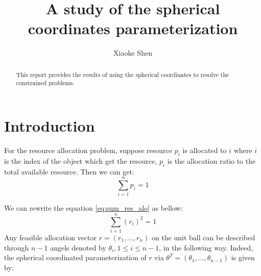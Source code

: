 \documentclass[a4paper,12pt]{article}
\title {A study of the spherical coordinates parameterization}
\author{Xiaoke Shen}
\affil{the Graduate Center, the City University of New York}
\date{}
\begin{document}
\maketitle

\begin{abstract}
This report provides the results of using the spherical coordinates to resolve the constrained problems.
\end{abstract}
\part{Introduction}
For the resource allocation problem, suppose resource $p_i$ is allocated to $i$ where $i$ is the index of the object which get the resource, $p_i$ is the allocation ratio to the total available resource. Then we can get:\\
\begin{equation} \label{eq:sum_res_alo}
\sum_{i=1}^{n} p_i = 1
\end{equation}

We can rewrite the equation \ref{eq:sum_res_alo} as bellow:\\
\begin{equation} \label{eq:sum_res_alo_r_2}
\sum_{i=1}^{n} (r_i)^2 = 1
\end{equation}
Any feasible allocation vector $r = (r_1,...,r_n)$ on the unit ball can be described through $n-1$ angels denoted by $\theta_i, 1\leq i \leq n-1$, in the following way. Indeed, the spherical coordinated parameterization of $r$ via $\theta^T = (\theta_1,...,\theta_{n-1}) $ is given by:\\





\end{document}
